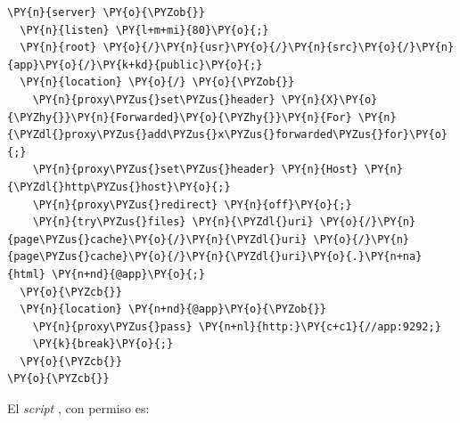 \begin{codelisting}
\label{code:nginxconf}
\begin{Verbatim}[fontsize=\relsize{-2.5},fontseries=b,commandchars=\\\{\}]
\PY{n}{server} \PY{o}{\PYZob{}}
  \PY{n}{listen} \PY{l+m+mi}{80}\PY{o}{;}
  \PY{n}{root} \PY{o}{/}\PY{n}{usr}\PY{o}{/}\PY{n}{src}\PY{o}{/}\PY{n}{app}\PY{o}{/}\PY{k+kd}{public}\PY{o}{;}
  \PY{n}{location} \PY{o}{/} \PY{o}{\PYZob{}}
    \PY{n}{proxy\PYZus{}set\PYZus{}header} \PY{n}{X}\PY{o}{\PYZhy{}}\PY{n}{Forwarded}\PY{o}{\PYZhy{}}\PY{n}{For} \PY{n}{\PYZdl{}proxy\PYZus{}add\PYZus{}x\PYZus{}forwarded\PYZus{}for}\PY{o}{;}
    \PY{n}{proxy\PYZus{}set\PYZus{}header} \PY{n}{Host} \PY{n}{\PYZdl{}http\PYZus{}host}\PY{o}{;}
    \PY{n}{proxy\PYZus{}redirect} \PY{n}{off}\PY{o}{;}
    \PY{n}{try\PYZus{}files} \PY{n}{\PYZdl{}uri} \PY{o}{/}\PY{n}{page\PYZus{}cache}\PY{o}{/}\PY{n}{\PYZdl{}uri} \PY{o}{/}\PY{n}{page\PYZus{}cache}\PY{o}{/}\PY{n}{\PYZdl{}uri}\PY{o}{.}\PY{n+na}{html} \PY{n+nd}{@app}\PY{o}{;}
  \PY{o}{\PYZcb{}}
  \PY{n}{location} \PY{n+nd}{@app}\PY{o}{\PYZob{}}
    \PY{n}{proxy\PYZus{}pass} \PY{n+nl}{http:}\PY{c+c1}{//app:9292;}
    \PY{k}{break}\PY{o}{;}
  \PY{o}{\PYZcb{}}
\PY{o}{\PYZcb{}}
\end{Verbatim}
\end{codelisting}

El \textit{script} , con permiso  es:


